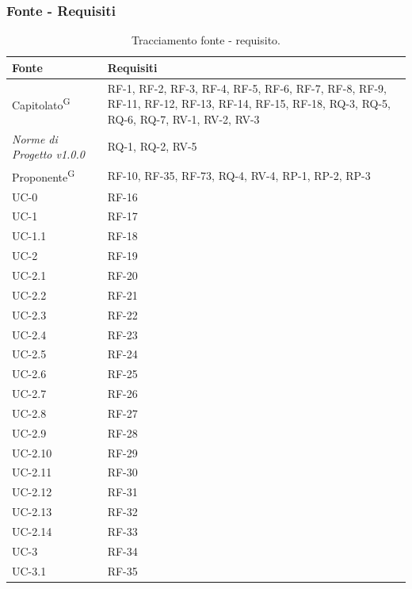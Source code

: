 \documentclass[8pt]{article}
\newcommand{\glossterm}[1]{#1\textsuperscript{G}} %
\begin{document}
\subsubsection{Fonte - Requisiti}
\begin{longtable}{|>{\centering\arraybackslash}p{4cm}|>{\centering\arraybackslash}p{7cm}|}
		\hline
  \rowcolor{white}
		\textbf{Fonte} & \textbf{Requisiti} \\
		\hline
  \endfirsthead
\rowcolor{white}
  \caption{Tracciamento fonte - requisito.}
	\label{table:Tracciamento requisito - fonte}
 \endlastfoot
            \glossterm{Capitolato} & RF-1, RF-2, RF-3, RF-4, RF-5, RF-6, RF-7, RF-8, RF-9, RF-11, RF-12, RF-13, RF-14, RF-15, RF-18, RQ-3, RQ-5, RQ-6, RQ-7, RV-1, RV-2, RV-3 \\ \hline
        \textit{Norme di Progetto v1.0.0} & RQ-1, RQ-2, RV-5 \\ \hline
            \glossterm{Proponente} & RF-10, RF-35, RF-73, RQ-4, RV-4, RP-1, RP-2, RP-3 \\ \hline
            UC-0 & RF-16 \\ \hline
            UC-1 & RF-17 \\ \hline
            UC-1.1 & RF-18 \\ \hline
            UC-2 & RF-19\\ \hline
            UC-2.1 & RF-20\\ \hline
            UC-2.2 & RF-21\\ \hline
            UC-2.3 & RF-22\\ \hline
            UC-2.4 & RF-23\\ \hline
            UC-2.5 & RF-24\\ \hline
            UC-2.6 & RF-25 \\ \hline
            UC-2.7 & RF-26\\ \hline
            UC-2.8 & RF-27\\ \hline
            UC-2.9 & RF-28\\ \hline
            UC-2.10 & RF-29\\ \hline
            UC-2.11 & RF-30\\ \hline
            UC-2.12 & RF-31\\ \hline
            UC-2.13 & RF-32\\ \hline
            UC-2.14 & RF-33\\ \hline
            UC-3 & RF-34\\ \hline
            UC-3.1 & RF-35\\ \hline

\end{longtable}
\end{document}
